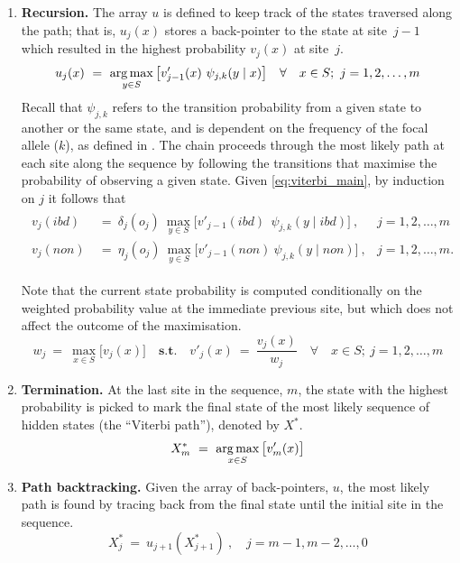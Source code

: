 \begin{enumerate}[label=\textbf{\arabic*.}]
	\item \textbf{Recursion.} The array $u$ is defined to keep track of the states traversed along the path; that is, ${u_j(x)}$ stores a back-pointer to the state at site~$j-1$ which resulted in the highest probability ${v_j(x)}$ at site~$j$.
	\begin{equation}
		u_j(x) ~=~ \operatorname*{arg\,max}_{y \in S} \big[ v'_{j-1}(x) ~ \psi_{j,k}(y \mid x) \big] \quad \forall \quad x \in S; ~ j = 1, 2, \ldots, m
	\end{equation}
	Recall that ${\psi_{j,k}}$ refers to the transition probability from a given state to another or the same state, and is dependent on the frequency of the focal allele ($k$), as defined in .
	The chain proceeds through the most likely path at each site along the sequence by following the transitions that maximise the probability of observing a given state.
	Given \cref{eq:viterbi_main}, by induction on $j$ it follows that
	\begin{align}
	\begin{aligned}
		v_j(\textit{ibd})  & ~=~ \delta_j(o_j) ~ \max_{y \in S} \big[ v'_{j-1}(\textit{ibd}) ~ ~ \psi_{j,k}(y \mid \textit{ibd}) \big]\ , & j = 1, 2, \ldots, m\phantom{.} \\
		v_j(\textit{non})  & ~=~ \eta_j(o_j) ~ \max_{y \in S} \big[ v'_{j-1}(\textit{non}) ~ \psi_{j,k}(y \mid \textit{non}) \big]\ , & j = 1, 2, \ldots, m.
	\end{aligned}
	\end{align}

	Note that the current state probability is computed conditionally on the weighted probability value at the immediate previous site, but which does not affect the outcome of the maximisation.
	\begin{equation}
		w_j ~=~ \max_{x \in S} \big[ v_j(x) \big] \quad\textbf{s.t.}\quad
		v'_j(x) ~=~ \frac{v_j(x)}{w_j} \quad \forall \quad x \in S; ~ j = 1, 2, \ldots, m
	\end{equation}

	\item \textbf{Termination.} At the last site in the sequence, $m$, the state with the highest probability is picked to mark the final state of the most likely sequence of hidden states (\ie the ``Viterbi path''), denoted by ${X^\ast}$.
	\begin{equation}
		X^\ast_m ~=~ \operatorname*{arg\,max}_{x \in S} \big[ v'_{m}(x) \big]
	\end{equation}

	\item \textbf{Path backtracking.} Given the array of back-pointers, $u$, the most likely path is found by tracing back from the final state until the initial site in the sequence.
	\begin{equation}
		X^\ast_j ~=~ u_{j+1}\left(X^\ast_{j+1}\right)\ , \quad j = m-1, m-2, \ldots, 0
	\end{equation}
\end{enumerate}

